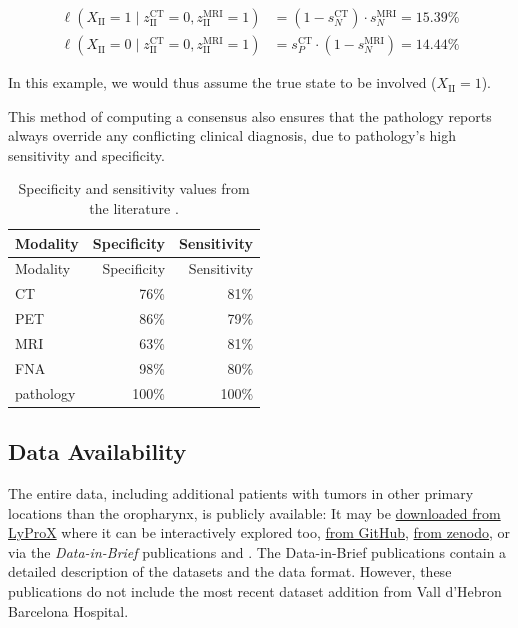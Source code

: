 \documentclass[
  sn-mathphys-num,
]{sn-jnl}
\begin{document}
\[
\begin{aligned}
\ell \left( X_\text{II} = 1 \mid z_\text{II}^\text{CT} = 0, z_\text{II}^\text{MRI} = 1 \right) &= \left( 1 - s_N^\text{CT} \right) \cdot s_N^\text{MRI} = 15.39\% \\
\ell \left( X_\text{II} = 0 \mid z_\text{II}^\text{CT} = 0, z_\text{II}^\text{MRI} = 1 \right) &= s_P^\text{CT} \cdot \left(1 - s_N^\text{MRI}\right) = 14.44\%
\end{aligned}
\]

In this example, we would thus assume the true state to be involved
(\(X_\text{II} = 1\)).

This method of computing a consensus also ensures that the pathology
reports always override any conflicting clinical diagnosis, due to
pathology's high sensitivity and specificity.

\begin{longtable}[]{@{}lrr@{}}
\caption{Specificity and sensitivity values from the literature
\citep{de_bondt_detection_2007, kyzas_18f-fluorodeoxyglucose_2008}.}\label{tbl-spec-sens}\tabularnewline
\toprule\noalign{}
Modality & Specificity & Sensitivity \\
\midrule\noalign{}
\endfirsthead
\toprule\noalign{}
Modality & Specificity & Sensitivity \\
\midrule\noalign{}
\endhead
\bottomrule\noalign{}
\endlastfoot
CT & 76\% & 81\% \\
PET & 86\% & 79\% \\
MRI & 63\% & 81\% \\
FNA & 98\% & 80\% \\
pathology & 100\% & 100\% \\
\end{longtable}

\subsection{Data Availability}\label{data-availability}

The entire data, including additional patients with tumors in other
primary locations than the oropharynx, is publicly available: It may be
\href{https://lyprox.org/patients/dataset}{downloaded from LyProX} where
it can be interactively explored too,
\href{https://github.com/rmnldwg/lydata}{from GitHub},
\href{https://zenodo.org/search?q=lydata}{from zenodo}, or via the
\emph{Data-in-Brief} publications \citet{ludwig_dataset_2022} and
\citet{ludwig_multi-centric_2023}. The Data-in-Brief publications
contain a detailed description of the datasets and the data format.
However, these publications do not include the most recent dataset
addition from Vall d'Hebron Barcelona Hospital.
\end{document}
